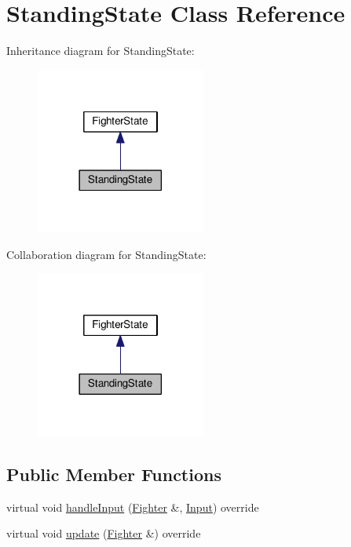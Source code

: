 \hypertarget{classStandingState}{}\section{Standing\+State Class Reference}
\label{classStandingState}


Inheritance diagram for Standing\+State\+:
\nopagebreak
\begin{figure}[H]
\begin{center}
\leavevmode
\includegraphics[width=158pt]{classStandingState__inherit__graph}
\end{center}
\end{figure}


Collaboration diagram for Standing\+State\+:
\nopagebreak
\begin{figure}[H]
\begin{center}
\leavevmode
\includegraphics[width=158pt]{classStandingState__coll__graph}
\end{center}
\end{figure}
\subsection*{Public Member Functions}
\begin{DoxyCompactItemize}
\item 
virtual void \hyperlink{classStandingState_a63e99bb4fb71ef88ba573ad902337e7c}{handle\+Input} (\hyperlink{classFighter}{Fighter} \&, \hyperlink{State_8cpp_a080a822f0093973313bd644e517a5090}{Input}) override
\item 
virtual void \hyperlink{classStandingState_a3a99901a53764049b39df5b8f016fb66}{update} (\hyperlink{classFighter}{Fighter} \&) override
\end{DoxyCompactItemize}
